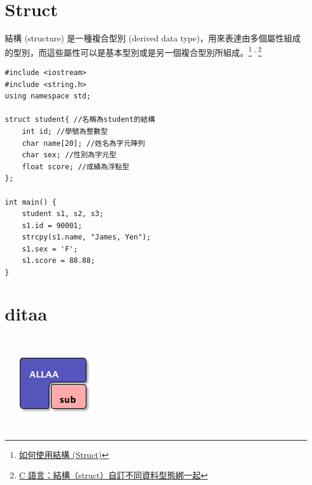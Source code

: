 \documentclass[12pt,a4paper]{article}
\begin{document}
\section{Struct}
\label{cpp_struct}
結構 (structure) 是一種複合型別 (derived data type)，用來表達由多個屬性組成的型別，而這些屬性可以是基本型別或是另一個複合型別所組成。\footnote{\href{https://michaelchen.tech/c-programming/struct/}{如何使用結構 (Struct)}} \textsuperscript{,}\,\footnote{\href{https://kopu.chat/2017/05/30/c-\%E8\%AA\%9E\%E8\%A8\%80\%EF\%BC\%9A\%E7\%B5\%90\%E6\%A7\%8B\%EF\%BC\%88struct\%EF\%BC\%89\%E8\%87\%AA\%E8\%A8\%82\%E4\%B8\%8D\%E5\%90\%8C\%E8\%B3\%87\%E6\%96\%99\%E5\%9E\%8B\%E6\%85\%8B\%E7\%B6\%81\%E4\%B8\%80\%E8\%B5\%B7/}{C 語言：結構（struct）自訂不同資料型態綁一起}}
\lstset{breaklines=true,language=cpp,label= ,caption= ,captionpos=b,firstnumber=1,numbers=left}
\begin{lstlisting}
#include <iostream>
#include <string.h>
using namespace std;

struct student{ //名稱為student的結構
    int id; //學號為整數型
    char name[20]; //姓名為字元陣列
    char sex; //性別為字元型
    float score; //成績為浮點型
};

int main() {
    student s1, s2, s3;
    s1.id = 90001;
    strcpy(s1.name, "James, Yen");
    s1.sex = 'F';
    s1.score = 88.88;
}

\end{lstlisting}

\section{ditaa}
\label{sec:orgcbcfc63}
\begin{center}
\includegraphics[width=.9\linewidth]{blue.png}
\end{center}
\end{document}
